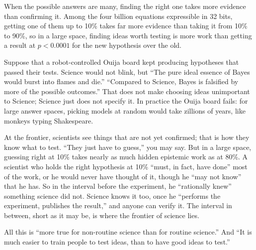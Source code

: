 When the possible answers are many, finding the right one takes more evidence than confirming it. Among the four billion equations expressible in 32 bits, getting one of them up to 10\% takes far more evidence than taking it from 10\% to 90\%, so in a large space, finding ideas worth testing is more work than getting a result at $p<0.0001$ for the new hypothesis over the old. 

Suppose that a robot-controlled Ouija board kept producing hypotheses that passed their tests. Science would not blink, but ``The pure ideal essence of Bayes would burst into flames and die.''  ``Compared to Science, Bayes is falsified by more of the possible outcomes.'' That does not make choosing ideas unimportant to Science; Science just does not specify it. In practice the Ouija board fails: for large answer spaces, picking models at random would take zillions of years, like monkeys typing Shakespeare.

At the frontier, scientists see things that are not yet confirmed; that is how they know what to test. ``They just have to guess,'' you may say. But in a large space, guessing right at 10\% takes nearly as much hidden epistemic work as at 80\%. A scientist who holds the right hypothesis at 10\% ``must, in fact, have done'' most of the work, or he would never have thought of it, though he ``may not know'' that he has. So in the interval before the experiment, he ``rationally knew'' something science did not.  Science knows it too, once he ``performs the experiment, publishes the result,'' and anyone can verify it. The interval in between, short as it may be, is where the frontier of science lies.

All this is ``more true for non-routine science than for routine science.'' And ``It is much easier to train people to test ideas, than to have good ideas to test.''
